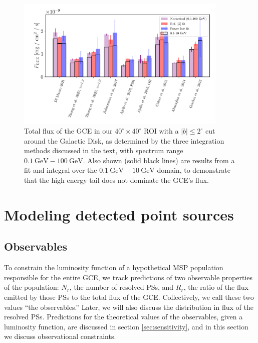 \documentclass[letter,11pt]{article}
\begin{document}
\begin{figure}
    \centering
    \includegraphics[width=0.9\textwidth]{figs/total-flux-bars.pdf}
    \caption{Total flux of the GCE in our $40^\circ \times 40^\circ$ ROI with a $|b| \leq 2^\circ$ cut around the Galactic Disk, as determined by the three integration methods discussed in the text, with spectrum range $\SI{0.1}{\giga\electronvolt}-\SI{100}{\giga\electronvolt}$. Also shown (solid black lines) are results from a fit and integral over the $\SI{0.1}{\giga\electronvolt}-\SI{10}{\giga\electronvolt}$ domain, to demonstrate that the high energy tail does not dominate the GCE's flux.}
    \label{fig:total-flux-bars}
\end{figure}

\section{Modeling detected point sources}
\label{sec:pointsources}

\subsection{Observables}
\label{sec:observables}
To constrain the luminosity function of a hypothetical MSP population responsible for the entire GCE, we track predictions of two observable properties of the population: $N_r$, the number of resolved PSs, and $R_r$, the ratio of the flux emitted by those PSs to the total flux of the GCE. Collectively, we call these two values ``the observables.'' Later, we will also discuss the distribution in flux of the resolved PSs. Predictions for the theoretical values of the observables, given a luminosity function, are discussed in section \ref{sec:sensitivity}, and in this section we discuss observational constraints.
\end{document}
